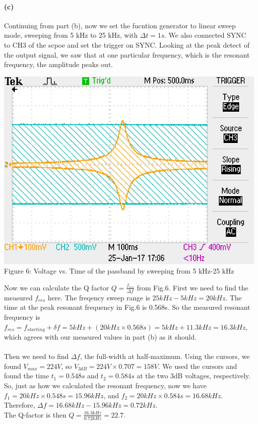 \documentclass[]{article}
\begin{document}
	\paragraph{ (c)} 	
	Continuing from part (b), now we set the fucntion generator to linear sweep mode, sweeping from 5 kHz to 25 kHz, with $\Delta t=1s$. We also connected SYNC to CH3 of the scpoe and set the trigger on SYNC. Looking at the peak detect of the output signal, we saw that at one particular frequency, which is the resonant frequency, the amplitude peaks out. 
	\begin{center}
		\includegraphics[scale=0.8]{c_qfactor}\\
		Figure 6: Voltage vs. Time of  the passband by sweeping from 5 kHz-25 kHz
	\end{center}
	Now we can calculate the Q factor $Q=\frac{f_{res}}{\Delta f}$ from Fig.6. First we need to find the measured $f_{res}$ here. The freqency sweep range is $25 kHz-5 kHz=20 kHz$. The time at the peak resonant frequency in Fig.6 is 0.568s.  So the measured resonant frequency is $f_{res}= f_{starting}+\delta f=5 kHz+ (20kHz\times 0.568s)=5 kHz+11.3 kHz=16.3kHz$, which agrees with our measured values in part (b) as it should.  \\ \\ Then we need to find $\Delta f$, the full-width at half-maximum. Using the cursors, we found $V_{max}=224V$, so $V_{3dB}=224V\times 0.707=158V$. We used the cursors and found the time $t_{1}=0.548s$ and $t_{2}=0.584s$ at the two 3dB voltages, respectively. So, just as how we calculated the resonant frequency, now we have $f_{1}=20 kHz\times 0.548s=15.96 kHz$, and $f_{2}=20 kHz\times 0.584s=16.68kHz$. Therefore, $\Delta f=16.68kHz-15.96 kHz=0.72 kHz$. \\The Q-factor is then $Q=\frac{16.3 kHz}{0.72 kHz}=22.7$. 
\end{document}
